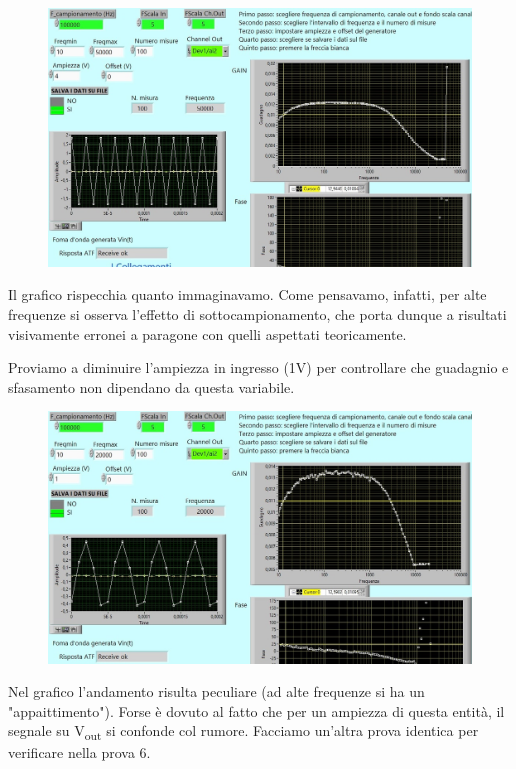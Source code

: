 \begin{figure}[H]
\caption{}
    \includegraphics[width=12cm]{settimana_2/immagini/rccr_4.jpg}
    \centering
\end{figure}

Il grafico rispecchia quanto immaginavamo. Come pensavamo, infatti, per alte frequenze si osserva l'effetto di sottocampionamento, che porta dunque a risultati visivamente erronei a paragone con quelli aspettati teoricamente. 

Proviamo a diminuire l'ampiezza in ingresso (1V) per controllare che guadagnio e sfasamento non dipendano da questa variabile.

\begin{figure}[H]
\caption{}
    \includegraphics[width=12cm]{settimana_2/immagini/rccr_5.jpg}
    \centering
\end{figure}

Nel grafico l'andamento risulta peculiare (ad alte frequenze si ha un "appaittimento"). Forse è dovuto al fatto che per un ampiezza di questa entità, il segnale su V\textsubscript{out} si confonde col rumore. Facciamo un'altra prova identica per verificare nella prova 6.

